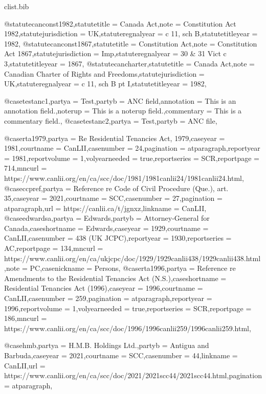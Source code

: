 \begin{filecontents*}[overwrite]{clist\jobname.bib}

@statute{canconst1982,statutetitle = {Canada Act},note = {Constitution Act 1982},statutejurisdiction = {UK},statuteregnalyear = {c 11, sch B},statutetitleyear = {1982},}
@statute{canconst1867,statutetitle = {Constitution Act},note = {Constitution Act 1867},statutejurisdiction = {Imp},statuteregnalyear = {30 \& 31 Vict c 3},statutetitleyear = {1867},}
@statute{cancharter,statutetitle = {Canada Act},note = {Canadian Charter of Rights and Freedoms},statutejurisdiction = {UK},statuteregnalyear = {c 11, sch B pt I},statutetitleyear = {1982},}

@case{testanc1,partya = {Test},partyb = {ANC field},annotation = {This is an annotation field.},noterup = {This is a noterup field.},commentary = {This is a commentary field.},}
@case{testanc2,partya = {Test},partyb = {ANC file},}

@case{rta1979,partya =  {Re Residential Tenancies Act, 1979},caseyear =  {1981},courtname =  {CanLII},casenumber =  {24},pagination =  {atparagraph},reportyear =  {1981},reportvolume =  {1},volyearneeded =  {true},reportseries =  {SCR},reportpage =  {714},mncurl =  {https://www.canlii.org/en/ca/scc/doc/1981/1981canlii24/1981canlii24.html},}
@case{ccpref,partya =  {Reference re Code of Civil Procedure (Que.), art. 35},caseyear =  {2021},courtname =  {SCC},casenumber =  {27},pagination =  {atparagraph},url =  {https://canlii.ca/t/jgnxz},linkname =  {CanLII},}
@case{edwardsa,partya =  {Edwards},partyb =  {Attorney‑General for Canada},caseshortname =  {Edwards},caseyear =  {1929},courtname =  {CanLII},casenumber =  {438 (UK JCPC)},reportyear =  {1930},reportseries =  {AC},reportpage =  {134},mncurl =  {https://www.canlii.org/en/ca/ukjcpc/doc/1929/1929canlii438/1929canlii438.html},note =  {PC},casenickname =  {Persons},}
@case{rta1996,partya =  {Reference re Amendments to the Residential Tenancies Act (N.S.)},caseshortname =  {Residential Tenancies Act (1996)},caseyear =  {1996},courtname =  {CanLII},casenumber =  {259},pagination =  {atparagraph},reportyear =  {1996},reportvolume =  {1},volyearneeded =  {true},reportseries =  {SCR},reportpage =  {186},mncurl =  {https://www.canlii.org/en/ca/scc/doc/1996/1996canlii259/1996canlii259.html},}

@case{hmb,partya = {H.M.B. Holdings Ltd.},partyb = {Antigua and Barbuda},caseyear = {2021},courtname = {SCC},casenumber = {44},linkname = {CanLII},url = {https://www.canlii.org/en/ca/scc/doc/2021/2021scc44/2021scc44.html},pagination = {atparagraph},}


\end{filecontents*}
